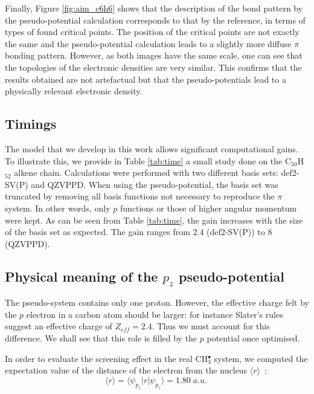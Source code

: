 \documentclass[12pt]{article}
\begin{document}
Finally, Figure \ref{fig:aim_c6h6} shows that the description of the bond pattern by the pseudo-potential
calculation corresponds to that by the reference, in terms of types of found critical points.
The position of the critical points are not exactly the same and the pseudo-potential calculation
leads to a slightly more diffuse $\pi$ bonding pattern.
However, as both images have the same scale, one can see that the topologies
of the electronic densities are very similar.
This confirms that the results obtained are not artefactual but that the pseudo-potentials
lead to a physically relevant electronic density.

\subsection*{\sffamily \large Timings}
The model that we develop in this work allows significant computational gains.
To illustrate this, we provide in Table \ref{tab:time} a small study done on the C$_{50}$H$_{52}$
alkene chain.
Calculations were performed with two different basis sets: def2-SV(P) and QZVPPD.
When using the pseudo-potential, the basis set was truncated by removing all
basis functions not necessary to reproduce the
$\pi$ system.
In other words, only $p$ functions or those of higher angular momentum were kept.
As can be seen from Table \ref{tab:time}, the gain increases
with the size of the basis set as expected.
The gain ranges from 2.4 (def2-SV(P)) to 8 (QZVPPD).

\subsection*{\sffamily \large Physical meaning of the \(p_{z}\) pseudo-potential} \label{minimalpotguess}

The pseudo-system contains only one proton. However, the effective charge felt by the $p$ electron in a carbon atom should be larger: for instance Slater's rules suggest an effective charge of $Z_{eff}=2.4$. Thus we must account for this difference. We shall see that this role is filled by the $p$ potential once optimised. 

In order to evaluate the screening effect in the real CH\(^{\bullet}_{3}\) system, we computed the expectation value of the distance of the electron from the nucleus \( \langle r \rangle \)~:
\begin{equation}
\langle r \rangle = \langle \psi_{p_{z}} | r | \psi_{p_{z}} \rangle = 1.80\;a.u.\
\label{equation:exp_r}
\end{equation}
\end{document}
